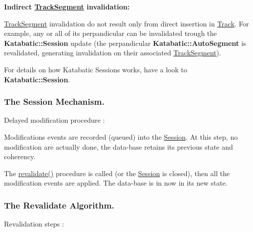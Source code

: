 {\bfseries Indirect \mbox{\hyperlink{classKite_1_1TrackSegment}{Track\+Segment}} invalidation\+:}
\begin{DoxyItemize}
\item \mbox{\hyperlink{classKite_1_1TrackSegment}{Track\+Segment}} invalidation do not result only from direct insertion in \mbox{\hyperlink{classKite_1_1Track}{Track}}. For example, any or all of it\textquotesingle{}s perpandicular can be invalidated trough the \textbf{ Katabatic\+::\+Session} update (the perpandicular \textbf{ Katabatic\+::\+Auto\+Segment} is revalidated, generating invalidation on their associated \mbox{\hyperlink{classKite_1_1TrackSegment}{Track\+Segment}}).
\end{DoxyItemize}

For details on how Katabatic Sessions works, have a look to \textbf{ Katabatic\+::\+Session}.\hypertarget{classKite_1_1Session_secSessionMechanism}{}\subsubsection{The Session Mechanism.}\label{classKite_1_1Session_secSessionMechanism}
Delayed modification procedure \+:
\begin{DoxyItemize}
\item Modifications events are recorded (queued) into the \mbox{\hyperlink{classKite_1_1Session}{Session}}. At this step, no modification are actually done, the data-\/base retains it\textquotesingle{}s previous state and coherency.
\item The {\ttfamily \mbox{\hyperlink{classKite_1_1Session_a5bd93abe1416952ace15a98dbeeed124}{revalidate()}}} procedure is called (or the \mbox{\hyperlink{classKite_1_1Session}{Session}} is closed), then all the modification events are applied. The data-\/base is in now in it\textquotesingle{}s new state.
\end{DoxyItemize}\hypertarget{classKite_1_1Session_secKiteSessionRevalidate}{}\subsubsection{The Revalidate Algorithm.}\label{classKite_1_1Session_secKiteSessionRevalidate}
Revalidation steps \+:
